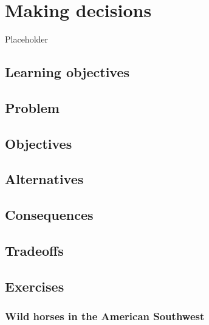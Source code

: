 \documentclass[]{book}
\theoremstyle{definition}
\theoremstyle{definition}
\theoremstyle{definition}
\theoremstyle{remark}
\begin{document}
\hypertarget{chap:sdm}{%
\chapter{Making decisions}\label{chap:sdm}}

Placeholder

\hypertarget{learning-objectives-1}{%
\section{Learning objectives}\label{learning-objectives-1}}

\hypertarget{problem}{%
\section{Problem}\label{problem}}

\hypertarget{objectives}{%
\section{Objectives}\label{objectives}}

\hypertarget{alternatives}{%
\section{Alternatives}\label{alternatives}}

\hypertarget{consequences}{%
\section{Consequences}\label{consequences}}

\hypertarget{tradeoffs}{%
\section{Tradeoffs}\label{tradeoffs}}

\hypertarget{exercises}{%
\section{Exercises}\label{exercises}}

\hypertarget{wild-horses-in-the-american-southwest}{%
\subsection*{Wild horses in the American
Southwest}\label{wild-horses-in-the-american-southwest}}
\end{document}
